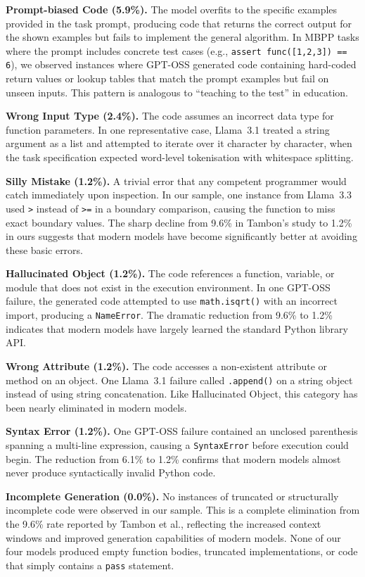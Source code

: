 \documentclass[smallextended]{svjour3}
\begin{document}
\textbf{Prompt-biased Code (5.9\%).} The model overfits to the specific examples provided in the task prompt, producing code that returns the correct output for the shown examples but fails to implement the general algorithm. In MBPP tasks where the prompt includes concrete test cases (e.g., \texttt{assert func([1,2,3]) == 6}), we observed instances where GPT-OSS generated code containing hard-coded return values or lookup tables that match the prompt examples but fail on unseen inputs. This pattern is analogous to ``teaching to the test'' in education.

\textbf{Wrong Input Type (2.4\%).} The code assumes an incorrect data type for function parameters. In one representative case, Llama~3.1 treated a string argument as a list and attempted to iterate over it character by character, when the task specification expected word-level tokenisation with whitespace splitting.

\textbf{Silly Mistake (1.2\%).} A trivial error that any competent programmer would catch immediately upon inspection. In our sample, one instance from Llama~3.3 used \texttt{>} instead of \texttt{>=} in a boundary comparison, causing the function to miss exact boundary values. The sharp decline from 9.6\% in Tambon's study to 1.2\% in ours suggests that modern models have become significantly better at avoiding these basic errors.

\textbf{Hallucinated Object (1.2\%).} The code references a function, variable, or module that does not exist in the execution environment. In one GPT-OSS failure, the generated code attempted to use \texttt{math.isqrt()} with an incorrect import, producing a \texttt{NameError}. The dramatic reduction from 9.6\% to 1.2\% indicates that modern models have largely learned the standard Python library API.

\textbf{Wrong Attribute (1.2\%).} The code accesses a non-existent attribute or method on an object. One Llama~3.1 failure called \texttt{.append()} on a string object instead of using string concatenation. Like Hallucinated Object, this category has been nearly eliminated in modern models.

\textbf{Syntax Error (1.2\%).} One GPT-OSS failure contained an unclosed parenthesis spanning a multi-line expression, causing a \texttt{SyntaxError} before execution could begin. The reduction from 6.1\% to 1.2\% confirms that modern models almost never produce syntactically invalid Python code.

\textbf{Incomplete Generation (0.0\%).} No instances of truncated or structurally incomplete code were observed in our sample. This is a complete elimination from the 9.6\% rate reported by Tambon et al., reflecting the increased context windows and improved generation capabilities of modern models. None of our four models produced empty function bodies, truncated implementations, or code that simply contains a \texttt{pass} statement.
\end{document}
